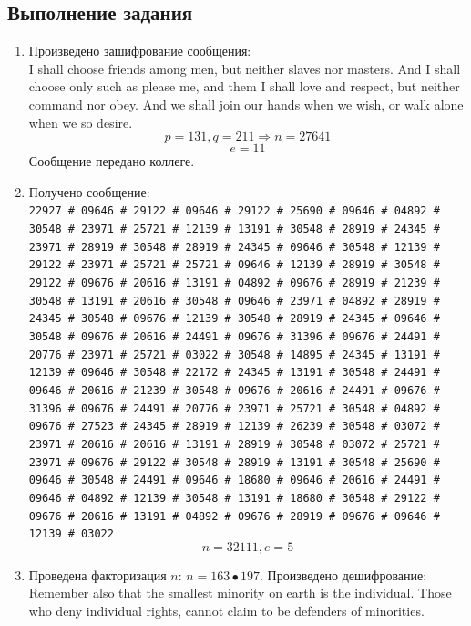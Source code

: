 \documentclass[a4paper, 14pt]{extarticle}
\begin{document}
\subsection{Выполнение задания}
\begin{enumerate}
    \item Произведено зашифрование сообщения:\\
    I shall choose friends among men, but neither slaves nor masters. And I shall choose only such as please me, and them I shall love and respect, but neither command nor obey. And we shall join our hands when we wish, or walk alone when we so desire.
    \[ p = 131, q = 211 \Rightarrow n = 27641 \]
    \[ e = 11 \]
    Сообщение передано коллеге.
    \item Получено сообщение:\\
    \texttt{22927 \# 09646 \# 29122 \# 09646 \# 29122 \# 25690 \# 09646 \# 04892 \# 30548 \# 23971 \# 25721 \# 12139 \# 13191 \# 30548 \# 28919 \# 24345 \# 23971 \# 28919 \# 30548 \# 28919 \# 24345 \# 09646 \# 30548 \# 12139 \# 29122 \# 23971 \# 25721 \# 25721 \# 09646 \# 12139 \# 28919 \# 30548 \# 29122 \# 09676 \# 20616 \# 13191 \# 04892 \# 09676 \# 28919 \# 21239 \# 30548 \# 13191 \# 20616 \# 30548 \# 09646 \# 23971 \# 04892 \# 28919 \# 24345 \# 30548 \# 09676 \# 12139 \# 30548 \# 28919 \# 24345 \# 09646 \# 30548 \# 09676 \# 20616 \# 24491 \# 09676 \# 31396 \# 09676 \# 24491 \# 20776 \# 23971 \# 25721 \# 03022 \# 30548 \# 14895 \# 24345 \# 13191 \# 12139 \# 09646 \# 30548 \# 22172 \# 24345 \# 13191 \# 30548 \# 24491 \# 09646 \# 20616 \# 21239 \# 30548 \# 09676 \# 20616 \# 24491 \# 09676 \# 31396 \# 09676 \# 24491 \# 20776 \# 23971 \# 25721 \# 30548 \# 04892 \# 09676 \# 27523 \# 24345 \# 28919 \# 12139 \# 26239 \# 30548 \# 03072 \# 23971 \# 20616 \# 20616 \# 13191 \# 28919 \# 30548 \# 03072 \# 25721 \# 23971 \# 09676 \# 29122 \# 30548 \# 28919 \# 13191 \# 30548 \# 25690 \# 09646 \# 30548 \# 24491 \# 09646 \# 18680 \# 09646 \# 20616 \# 24491 \# 09646 \# 04892 \# 12139 \# 30548 \# 13191 \# 18680 \# 30548 \# 29122 \# 09676 \# 20616 \# 13191 \# 04892 \# 09676 \# 28919 \# 09676 \# 09646 \# 12139 \# 03022}
    \[ n = 32111, e = 5 \]
    \item Проведена факторизация $n$: $n = 163 \bullet 197$. Произведено дешифрование:\\
    Remember also that the smallest minority on earth is the individual. Those who deny individual rights, cannot claim to be defenders of minorities.

\end{enumerate}
\end{document}
